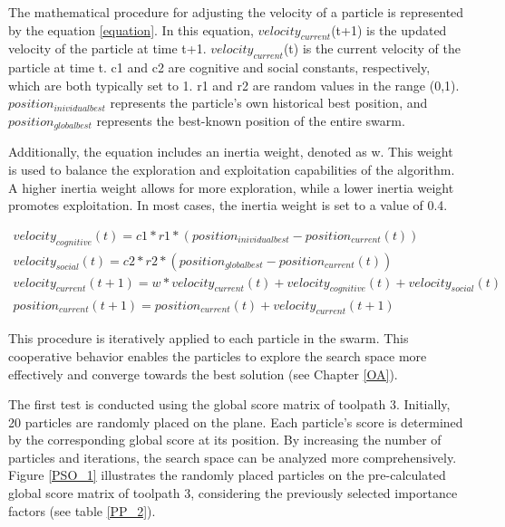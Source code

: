 The mathematical procedure for adjusting the velocity of a particle is represented by the equation \ref{equation}.
In this equation, $velocity_{current}$(t+1) is the updated velocity of the particle at time t+1. $velocity_{current}$(t) is the current velocity of the particle at time t. c1 and c2 are cognitive and social constants, respectively, which are both typically set to 1. r1 and r2 are random values in the range (0,1). $position_{inividual best}$ represents the particle's own historical best position, and $position_{global best}$ represents the best-known position of the entire swarm.

Additionally, the equation includes an inertia weight, denoted as w. This weight is used to balance the exploration and exploitation capabilities of the algorithm. A higher inertia weight allows for more exploration, while a lower inertia weight promotes exploitation. In most cases, the inertia weight is set to a value of 0.4.


\begin{equation}
	\begin{array}{l} 
	velocity_{cognitive}(t) = c1 * r1 * (position_{inividual best} - position_{current}(t))\\

	velocity_{social}(t) = c2 * r2 * (position_{global best} - position_{current}(t))\\

	velocity_{current}(t+1) = w * velocity_{current}(t) + velocity_{cognitive}(t) + velocity_{social}(t)\\
	
	position_{current}(t+1) = position_{current}(t) + velocity_{current}(t+1)
	\end{array}
	\label{equation}
\end{equation}  


This procedure is iteratively applied to each particle in the swarm. This cooperative behavior enables the particles to explore the search space more effectively and converge towards the best solution (see Chapter \ref{OA}).

The first test is conducted using the global score matrix of toolpath 3. Initially, 20 particles are randomly placed on the plane. Each particle's score is determined by the corresponding global score at its position. By increasing the number of particles and iterations, the search space can be analyzed more comprehensively. Figure \ref{PSO_1} illustrates the randomly placed particles on the pre-calculated global score matrix of toolpath 3, considering the previously selected importance factors (see table \ref{PP_2}).


